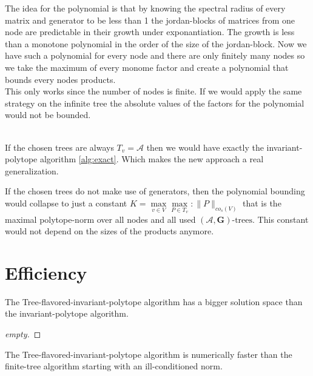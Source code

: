 The idea for the polynomial is that by knowing the spectral radius of every matrix and generator to be less than 1 the jordan-blocks of matrices from one node are predictable in their growth under exponantiation. The growth is less than a monotone polynomial in the order of the size of the jordan-block. Now we have such a polynomial for every node and there are only finitely many nodes so we take the maximum of every monome factor and create a polynomial that bounds every nodes products.\\
This only works since the number of nodes is finite. If we would apply the same strategy on the infinite tree the absolute values of the factors for the polynomial would not be bounded. \\ \\

\begin{corollary}
  If the chosen trees are always $T_v = \mathcal{A}$ then we would have exactly the invariant-polytope algorithm \ref{alg:exact}. Which makes the new approach a real generalization. 
\end{corollary}

\begin{corollary}
  If the chosen trees do not make use of generators, then the polynomial bounding would collapse to just a constant $ K = \max\limits_{v \in V}\max\limits_{P \in T_{v}}: \lVert P \rVert_{co_{s}(V)}$ that is the maximal polytope-norm over all nodes and all used $(\mathcal{A},\mathbf{G})\text{-trees}$. This constant would not depend on the sizes of the products anymore.
\end{corollary}

\section{Efficiency}

\begin{theorem}
  The Tree-flavored-invariant-polytope algorithm has a bigger solution space than the invariant-polytope algorithm.
\end{theorem}

\begin{proof}
  [empty]
\end{proof}

\begin{theorem}
  The Tree-flavored-invariant-polytope algorithm is numerically faster than the finite-tree algorithm starting with an ill-conditioned norm.
\end{theorem}

